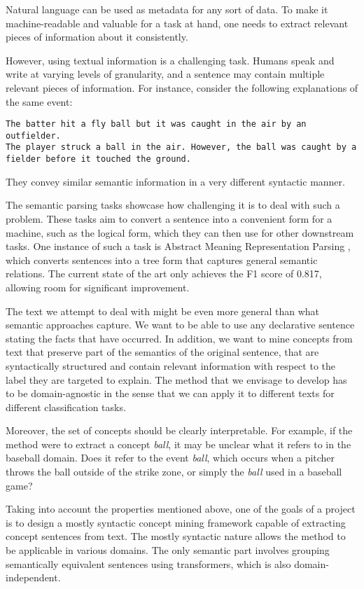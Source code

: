 Natural language can be used as metadata for any sort of data.
To make it machine-readable and valuable for a task at hand, one needs to extract relevant pieces of information about it consistently.

However, using textual information is a challenging task.
Humans speak and write at varying levels of granularity, and a sentence may contain multiple relevant pieces of information.
For instance, consider the following explanations of the same event:
\begin{lstlisting}
The batter hit a fly ball but it was caught in the air by an outfielder.
The player struck a ball in the air. However, the ball was caught by a fielder before it touched the ground.
\end{lstlisting}
They convey similar semantic information in a very different syntactic manner.

The semantic parsing tasks showcase how challenging it is to deal with such a problem.
These tasks aim to convert a sentence into a convenient form for a machine, such as the logical form, which they can then use for other downstream tasks.
One instance of such a task is Abstract Meaning Representation Parsing \cite{RefWorks:RefID:92-banarescu2013abstract}, which converts sentences into a tree form that captures general semantic relations.
The current state of the art \cite{RefWorks:RefID:93-zhou2021structure-aware} only achieves the F1 score of 0.817, allowing room for significant improvement.

The text we attempt to deal with might be even more general than what semantic approaches capture.
We want to be able to use any declarative sentence stating the facts that have occurred.
In addition, we want to mine concepts from text that preserve part of the semantics of the original sentence, that are syntactically structured and contain relevant information with respect to the label they are targeted to explain. 
The method that we envisage to develop has to be domain-agnostic in the sense that we can apply it to different texts for different classification tasks.

Moreover, the set of concepts should be clearly interpretable.
For example, if the method were to extract a concept \emph{ball}, it may be unclear what it refers to in the baseball domain.
Does it refer to the event \emph{ball}, which occurs when a pitcher throws the ball outside of the strike zone, or simply the \emph{ball} used in a baseball game?

Taking into account the properties mentioned above, one of the goals of a project is to design a mostly syntactic concept mining framework capable of extracting concept sentences from text.
The mostly syntactic nature allows the method to be applicable in various domains.
The only semantic part involves grouping semantically equivalent sentences using transformers, which is also domain-independent.

